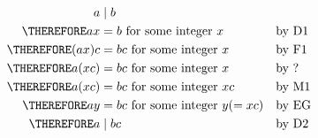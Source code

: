 \begin{align*}
a &\mid b \\
\THEREFORE ax &= b \text{ for some integer $x$}       & & \text{by D1} \\
\THEREFORE (ax)c &= bc \text{ for some integer $x$}   & & \text{by F1} \\
\THEREFORE a(xc) &= bc \text{ for some integer $x$}   & & \text{by ?} \\
\THEREFORE a(xc) &= bc \text{ for some integer $xc$}  & & \text{by M1} \\
\THEREFORE ay &= bc \text{ for some integer $y(=xc)$} & & \text{by EG} \\
\THEREFORE a &\mid bc                                 & & \text{by D2} \\
\end{align*}
